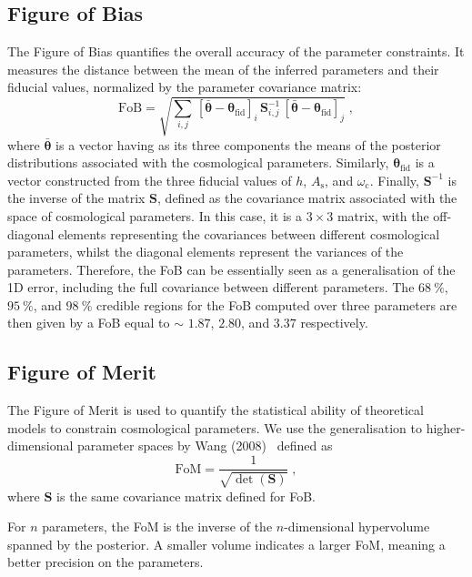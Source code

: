 \documentclass[12pt,a4paper,oneside]{report}
\begin{document}
\subsection{Figure of Bias}\label{subsec:FoB}
The Figure of Bias quantifies the overall accuracy of the parameter constraints. It measures the distance between the mean of the inferred parameters and their fiducial values, normalized by the parameter covariance matrix:
\begin{equation}
  \mathrm{FoB} = \sqrt{\sum_{i,j} \, [\bar{\boldsymbol{\theta}} - \boldsymbol{\theta}_\mathrm{fid}]_i \, \mathbf{S}_{i,j}^{-1} \, [\bar{\boldsymbol{\theta}} - \boldsymbol{\theta}_\mathrm{fid}]_j} \; ,
  \label{eq:FoB}
\end{equation}
where $\bar{\boldsymbol{\theta}}$ is a vector having as its three components the means of the posterior distributions associated with the cosmological parameters. Similarly, $\boldsymbol{\theta}_\mathrm{fid}$ is a vector constructed from the three fiducial values of $h$, $A_\mathrm{s}$, and $\omega_\mathrm{c}$. Finally, $\mathbf{S}^{-1}$ is the inverse of the matrix $\mathbf{S}$, defined as the covariance matrix associated with the space of cosmological parameters. In this case, it is a $3\times3$ matrix, with the off-diagonal elements representing the covariances between different cosmological parameters, whilst the diagonal elements represent the variances of the parameters.
Therefore, the FoB can be essentially seen as a generalisation of the 1D error, including the full covariance between different parameters. The $\SI{68}{\percent}$, $\SI{95}{\percent}$, and $\SI{98}{\percent}$ credible regions for the FoB computed over three parameters are then given by a FoB equal to $\sim$ $1.87$, $2.80$, and $3.37$ respectively.

\subsection{Figure of Merit}\label{subsec:FoM}
The Figure of Merit is used to quantify the statistical ability of theoretical models to constrain cosmological parameters. We use the generalisation to higher-dimensional parameter spaces by Wang (2008)~\cite{FoM_Wang} defined as
\begin{equation}
  \mathrm{FoM} = \frac{1}{\sqrt{\det(\mathbf{S})}} \; ,
  \label{eq:FoM}
\end{equation}
where $\mathbf{S}$ is the same covariance matrix defined for FoB.

For $n$ parameters, the FoM is the inverse of the $n$-dimensional hypervolume spanned by the posterior. A smaller volume indicates
a larger FoM, meaning a better precision on the parameters.
\end{document}
